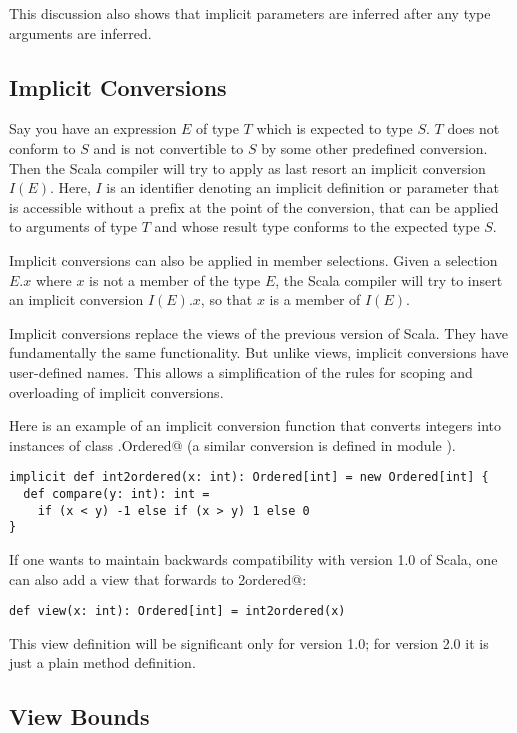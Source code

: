 \documentclass[a4paper,11pt,twoside]{article}
\begin{document}
This discussion also shows that implicit parameters are inferred after
any type arguments are inferred. 

\subsection*{Implicit Conversions}

Say you have an expression $E$ of type $T$ which is expected to type
$S$. $T$ does not conform to $S$ and is not convertible to $S$ by
some other predefined conversion. Then the Scala compiler will try to
apply as last resort an implicit conversion $I(E)$. Here, $I$ is an
identifier denoting an implicit definition or parameter that is
accessible without a prefix at the point of the conversion, that can
be applied to arguments of type $T$ and whose result type conforms to the
expected type $S$.

Implicit conversions can also be applied in member
selections. Given a selection $E.x$ where $x$ is not a member of the
type $E$, the Scala compiler will try to insert an implicit conversion
$I(E).x$, so that $x$ is a member of $I(E)$.

Implicit conversions replace the views of the previous version of Scala. They have
fundamentally the same functionality. But unlike views, implicit
conversions have user-defined names. This allows a simplification of
the rules for scoping and overloading of implicit conversions.

Here is an example of an implicit conversion function that converts
integers into instances of class \lstinline@scala.Ordered@ (a similar
conversion is defined in module ).
\begin{lstlisting}
implicit def int2ordered(x: int): Ordered[int] = new Ordered[int] {
  def compare(y: int): int = 
    if (x < y) -1 else if (x > y) 1 else 0
}
\end{lstlisting}
If one wants to maintain backwards compatibility with version 1.0 of Scala, one can
also add a view that forwards to \lstinline@int2ordered@:
\begin{lstlisting}
def view(x: int): Ordered[int] = int2ordered(x)
\end{lstlisting}
This view definition will be significant only for version 1.0; for version 2.0
it is just a plain method definition.

\subsection*{View Bounds}
\end{document}
